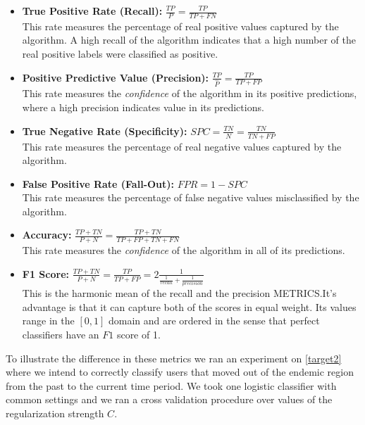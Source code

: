 \begin{itemize}
\item \textbf{True Positive Rate (Recall):} $\frac{TP}{P} = \frac{TP}{TP + FN}$ \\ This rate measures the percentage of real positive values captured by the algorithm.
A high recall of the algorithm indicates that a high number of the real positive labels were classified as positive.


\item \textbf{Positive Predictive Value (Precision):} $\frac{TP}{\hat{P}} = \frac{TP}{TP + FP}$ \\ This rate measures the \textit{confidence} of the algorithm in its positive predictions, where a high precision indicates value in its predictions.

\item \textbf{True Negative Rate (Specificity):} $ SPC = \frac{TN}{N} = \frac{TN}{TN + FP}$ \\ This rate measures the percentage of real negative values captured by the algorithm.


\item \textbf{False Positive Rate (Fall-Out):} $FPR = 1 - SPC$ \\ This rate measures the percentage of false negative values misclassified by the algorithm.

\item \textbf{Accuracy:} $\frac{TP + TN}{P + N} = \frac{TP + TN}{TP + FP + TN + FN}$ \\ This rate measures the \textit{confidence} of the algorithm in all of its predictions.


\item \textbf{F1 Score:} $\frac{TP + TN}{P + N} = \frac{TP}{TP + FP} = 2 \frac{1}{ \frac{1}{recall} + \frac{1}{precision} }$ \\ This is the harmonic mean of the recall and the precision METRICS.\@ It's advantage is that it can capture both of the scores in equal weight.
Its values range in the ${[0,1 ]}$ domain and are ordered in the sense that perfect classifiers have an $F1$ score of 1.

\end{itemize}


To illustrate the difference in these metrics we ran an experiment on \cref{target2} where we intend to correctly classify users that moved out of the endemic region from the past to the current time period.
We took one logistic classifier with common settings and we ran a cross validation procedure over values of the regularization strength $C$.

